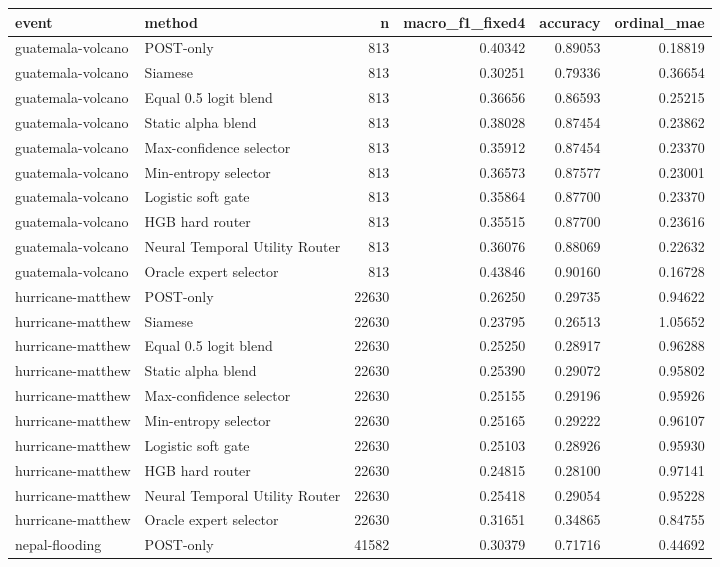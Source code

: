 \begin{tabular}{llrrrr}
\toprule
event & method & n & macro\_f1\_fixed4 & accuracy & ordinal\_mae \\
\midrule
guatemala-volcano & POST-only & 813 & 0.40342 & 0.89053 & 0.18819 \\
guatemala-volcano & Siamese & 813 & 0.30251 & 0.79336 & 0.36654 \\
guatemala-volcano & Equal 0.5 logit blend & 813 & 0.36656 & 0.86593 & 0.25215 \\
guatemala-volcano & Static alpha blend & 813 & 0.38028 & 0.87454 & 0.23862 \\
guatemala-volcano & Max-confidence selector & 813 & 0.35912 & 0.87454 & 0.23370 \\
guatemala-volcano & Min-entropy selector & 813 & 0.36573 & 0.87577 & 0.23001 \\
guatemala-volcano & Logistic soft gate & 813 & 0.35864 & 0.87700 & 0.23370 \\
guatemala-volcano & HGB hard router & 813 & 0.35515 & 0.87700 & 0.23616 \\
guatemala-volcano & Neural Temporal Utility Router & 813 & 0.36076 & 0.88069 & 0.22632 \\
guatemala-volcano & Oracle expert selector & 813 & 0.43846 & 0.90160 & 0.16728 \\
hurricane-matthew & POST-only & 22630 & 0.26250 & 0.29735 & 0.94622 \\
hurricane-matthew & Siamese & 22630 & 0.23795 & 0.26513 & 1.05652 \\
hurricane-matthew & Equal 0.5 logit blend & 22630 & 0.25250 & 0.28917 & 0.96288 \\
hurricane-matthew & Static alpha blend & 22630 & 0.25390 & 0.29072 & 0.95802 \\
hurricane-matthew & Max-confidence selector & 22630 & 0.25155 & 0.29196 & 0.95926 \\
hurricane-matthew & Min-entropy selector & 22630 & 0.25165 & 0.29222 & 0.96107 \\
hurricane-matthew & Logistic soft gate & 22630 & 0.25103 & 0.28926 & 0.95930 \\
hurricane-matthew & HGB hard router & 22630 & 0.24815 & 0.28100 & 0.97141 \\
hurricane-matthew & Neural Temporal Utility Router & 22630 & 0.25418 & 0.29054 & 0.95228 \\
hurricane-matthew & Oracle expert selector & 22630 & 0.31651 & 0.34865 & 0.84755 \\
nepal-flooding & POST-only & 41582 & 0.30379 & 0.71716 & 0.44692 \\

\end{tabular}
